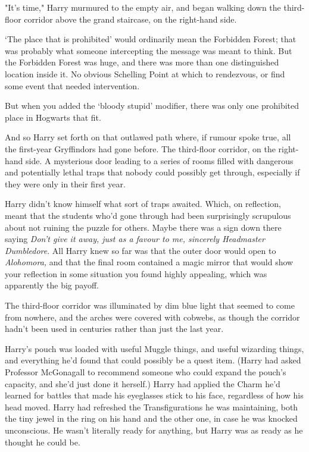 "It's time," Harry murmured to the empty air, and began walking down the
third-floor corridor above the grand staircase, on the right-hand side.

`The place that is prohibited' would ordinarily mean the Forbidden Forest; that
was probably what someone intercepting the message was meant to think. But the
Forbidden Forest was huge, and there was more than one distinguished location
inside it. No obvious Schelling Point at which to rendezvous, or find some
event that needed intervention.

But when you added the `bloody stupid' modifier, there was only one prohibited
place in Hogwarts that fit.

And so Harry set forth on that outlawed path where, if rumour spoke true, all
the first-year Gryffindors had gone before. The third-floor corridor, on the
right-hand side. A mysterious door leading to a series of rooms filled with
dangerous and potentially lethal traps that nobody could possibly get through,
especially if they were only in their first year.

Harry didn't know himself what sort of traps awaited. Which, on reflection,
meant that the students who'd gone through had been surprisingly scrupulous
about not ruining the puzzle for others. Maybe there was a sign down there
saying \emph{Don't give it away, just as a favour to me, sincerely Headmaster
Dumbledore}. All Harry knew so far was that the outer door would open to
\emph{Alohomora,} and that the final room contained a magic mirror that would
show your reflection in some situation you found highly appealing, which was
apparently the big payoff.

The third-floor corridor was illuminated by dim blue light that seemed to come
from nowhere, and the arches were covered with cobwebs, as though the corridor
hadn't been used in centuries rather than just the last year.

Harry's pouch was loaded with useful Muggle things, and useful wizarding
things, and everything he'd found that could possibly be a quest item. (Harry
had asked Professor McGonagall to recommend someone who could expand the
pouch's capacity, and she'd just done it herself.) Harry had applied the Charm
he'd learned for battles that made his eyeglasses stick to his face, regardless
of how his head moved. Harry had refreshed the Transfigurations he was
maintaining, both the tiny jewel in the ring on his hand and the other one, in
case he was knocked unconscious. He wasn't literally ready for anything, but
Harry was as ready as he thought he could be.

